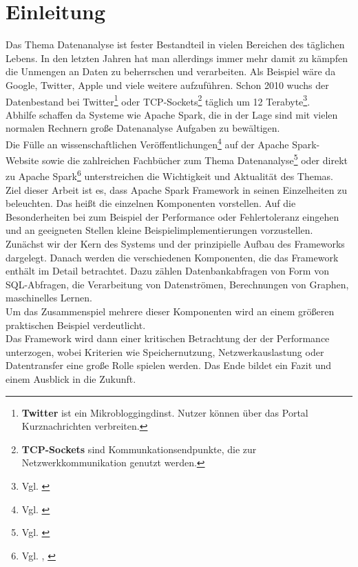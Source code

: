 \newpage
\chapter{Einleitung} 

Das Thema Datenanalyse ist fester Bestandteil in vielen Bereichen des täglichen Lebens. 
In den letzten Jahren hat man allerdings immer mehr damit zu kämpfen die Unmengen an Daten zu beherrschen und verarbeiten. Als Beispiel wäre da Google, Twitter, Apple und viele weitere aufzuführen. Schon 2010 wuchs der Datenbestand bei Twitter\footnote{\textbf{Twitter} ist ein Mikrobloggingdinst. Nutzer können über das Portal Kurznachrichten verbreiten. } oder TCP-Sockets\footnote{\textbf{TCP-Sockets} sind Kommunkationsendpunkte, die zur Netzwerkkommunikation genutzt werden. } täglich um 12 Terabyte\footnote{Vgl. \cite{TWITTER_12}}. \\
Abhilfe schaffen da Systeme wie Apache Spark, die in der Lage sind mit vielen normalen Rechnern große Datenanalyse Aufgaben zu bewältigen. \\

\noindent
Die Fülle an wissenschaftlichen Veröffentlichungen\footnote{Vgl. \cite{SPRESEARCH}} auf der Apache Spark-Website sowie die zahlreichen Fachbücher zum Thema Datenanalyse\footnote{Vgl. \cite{DA15}} oder direkt zu Apache Spark\footnote{Vgl. \cite{AAWS15}, \cite{BDS16}} unterstreichen die Wichtigkeit und Aktualität des Themas.\\

\noindent
Ziel dieser Arbeit ist es, dass Apache Spark Framework in seinen Einzelheiten zu beleuchten. Das heißt die einzelnen Komponenten vorstellen. Auf die Besonderheiten bei zum Beispiel der Performance oder Fehlertoleranz eingehen und an geeigneten Stellen kleine Beispielimplementierungen vorzustellen. \\

\noindent
Zunächst wir der Kern des Systems und der prinzipielle Aufbau des Frameworks dargelegt. Danach werden die verschiedenen Komponenten, die das Framework enthält im Detail betrachtet. Dazu zählen Datenbankabfragen von Form von SQL-Abfragen, die Verarbeitung von Datenströmen, Berechnungen von Graphen, maschinelles Lernen.\\
Um das Zusammenspiel mehrere dieser Komponenten wird an einem größeren praktischen Beispiel verdeutlicht. \\

\noindent
Das Framework wird dann einer kritischen Betrachtung der der Performance unterzogen, wobei Kriterien wie Speichernutzung, Netzwerkauslastung oder Datentransfer eine große Rolle spielen werden. Das Ende bildet ein Fazit und einem Ausblick in die Zukunft. 


